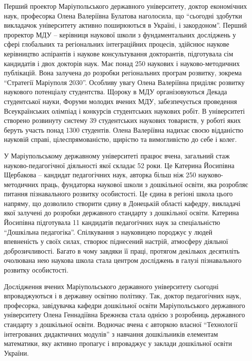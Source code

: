 
Перший проектор Маріупольського державного університету, доктор економічних
наук, професорка Олена Валеріївна Булатова наголосила, що \enquote{сьогодні здобутки
викладачок університету активно поширюються в Україні, і закордоном}. Перший
проректор МДУ – керівниця наукової школи з фундаментальних досліджень у сфері
глобальних та регіональних інтеграційних процесів, здійснює наукове керівництво
аспірантів і наукове консультування докторантів, підготувала сім кандидатів і
двох докторів наук. Має понад 250 наукових і науково-методичних публікацій.
Вона залучена до розробки регіональних програм розвитку, зокрема \enquote{Стратегії
Маріуполя 2030}. Особливу увагу Олена Валеріївна приділяє розвитку наукового
потенціалу студентства. Щороку в МДУ організовуються Декада студентської науки,
Форуми молодих вчених МДУ, забезпечується проведення Всеукраїнських олімпіад і
конкурсів студентських наукових робіт. В університеті створено розвинуту
систему 39 студентських наукових товариств, у роботі яких беруть участь понад
1300 студентів. Олена Валеріївна надихає своєю відданістю науковій справі,
цілеспрямованістю, щирістю та вимогливістю до себе і колег.


У Маріупольському державному університеті працює вчена, загальний стаж
науково-педагогічної діяльності якої складає 52 роки. Це Катерина Йосипівна
Щербакова – кандидат педагогічних наук, авторка більш ніж 250
науково-методичних праць, фундаторка наукової школи з дошкільної освіти, яка
розробляє питання пізнавального розвитку особистості. Це єдина в регіоні школа
цього напряму, що дозволило створити єдину в Донецькій області кафедру,
викладачі якої залучені до розробки державного стандарту з дошкільної освіти.
Катерина Йосипівна підготувала 11 кандидатів педагогічних наук за спеціальністю
\enquote{Дошкільна педагогіка}. Спілкування з науковицею породжує у людей
впевненість у своїх силах, створює піднесений настрій, атмосферу діяльної
доброзичливості. Багато в чому завдяки її праці, протягом декількох десятиліть
очолювана нею наукова школа стала центром досліджень в галузі пізнавального
розвитку особистості.


Дослідження вчених Маріупольського державного університету сьогодні
впроваджуються і в державну освітню політику. Так, доктор педагогічних наук,
професорка, завідувачка кафедри дошкільної освіти Маріупольського державного
університету Олена Геннадіївна Брежнєва стала однією з розробниць державного
стандарту з дошкільної освіти. Водночас вчена є авторкою власної
\enquote{Технології інтегрованих дидактичних модулів} з навчання дошкільників
елементам математики, яку активно пропагує і впроваджує у заклади  дошкільної
освіти України.

